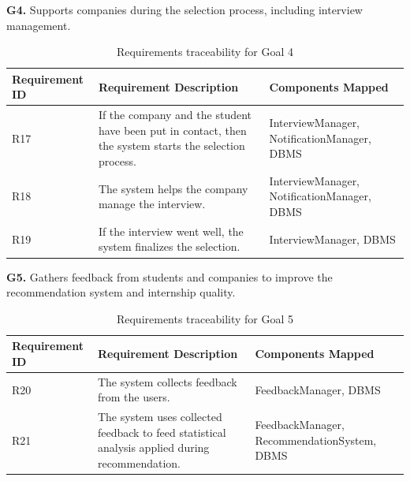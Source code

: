 \documentclass[12pt]{article}
\numberwithin{figure}{section}
\numberwithin{table}{section}
\begin{document}
\textbf{G4.}
Supports companies during the selection process, including interview management.

\begin{table}[H]
    \centering
    \begin{tabularx}{\textwidth}{|l|X|X|}
        \hline
        \textbf{Requirement ID} & \textbf{Requirement Description} & \textbf{Components Mapped} \\
        \hline
        R17 & If the company and the student have been put in contact, then the system starts the selection process. & InterviewManager, NotificationManager, DBMS \\
        \hline
        R18 & The system helps the company manage the interview. & InterviewManager, NotificationManager, DBMS \\
        \hline
        R19 & If the interview went well, the system finalizes the selection. & InterviewManager, DBMS \\
        \hline
    \end{tabularx}
    \caption{Requirements traceability for Goal 4}
    \label{tab:goal4}
\end{table}
\newpage
\textbf{G5.}
Gathers feedback from students and companies to improve the recommendation system and internship quality.

\begin{table}[H]
    \centering
    \begin{tabularx}{\textwidth}{|l|X|X|}
        \hline
        \textbf{Requirement ID} & \textbf{Requirement Description} & \textbf{Components Mapped} \\
        \hline
        R20 & The system collects feedback from the users. & FeedbackManager, DBMS \\
        \hline
        R21 & The system uses collected feedback to feed statistical analysis applied during recommendation. & FeedbackManager, RecommendationSystem, DBMS \\
        \hline
    \end{tabularx}
    \caption{Requirements traceability for Goal 5}
    \label{tab:goal5}
\end{table}




\newpage
\end{document}
